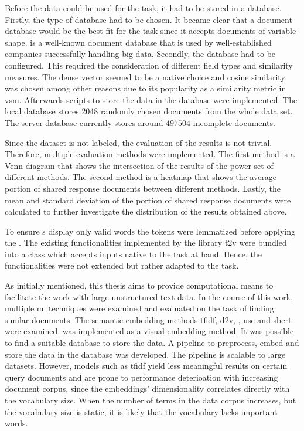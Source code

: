 Before the data could be used for the task, it had to be stored in a database.
Firstly, the type of database had to be chosen.
It became clear that a document database would be the best fit for the task 
since it accepts documents of variable shape.
\databaseName{} is a well-known document database that is used by 
well-established companies successfully handling big data.
Secondly, the database had to be configured.
This required the consideration of different field types and similarity measures.
The dense vector seemed to be a native choice and cosine similarity was chosen 
among other reasons due to its popularity as a similarity metric in \ac{vsm}.
Afterwards scripts to store the data in the database were implemented.
The local database stores 2048 randomly chosen documents from the whole data set.
The server database currently stores around $497504$ incomplete documents.

Since the dataset is not labeled, the evaluation of the results is not trivial.
Therefore, multiple evaluation methods were implemented.
The first method is a Venn diagram that shows the intersection of the results of the power set of different methods.
The second method is a heatmap that shows the average portion of shared response documents between different methods.
Lastly, the mean and standard deviation of the portion of shared response documents were calculated 
to further investigate the distribution of the results obtained above.

To ensure \wordcloud{}s display only valid words the tokens were lemmatized before applying the \wordcloud{}. 
The existing functionalities implemented by the library \ac{t2v} were bundled into a class 
which accepts inputs native to the task at hand.
Hence, the functionalities were not extended but rather adapted to the task.  


As initially mentioned, this thesis aims to provide computational means to facilitate the work with large unstructured text data.
In the course of this work, multiple \ac{ml} techniques were examined and evaluated on the task of finding similar documents.
The semantic embedding methods \ac{tfidf}, \ac{d2v}, \infersent{}, \ac{use} and \ac{sbert} were examined.
\eigendocs{} was implemented as a visual embedding method.
It was possible to find a suitable database to store the data.
A pipeline to preprocess, embed and store the data in the database was developed.
The pipeline is scalable to large datasets.
However, models such as \ac{tfidf} yield less meaningful results on certain query documents and 
are prone to performance deterioation with increasing document corpus, since the embeddings' 
dimensionality correlates directly with the vocabulary size.
When the number of terms in the data corpus increases, but the vocabulary size is static, 
it is likely that the vocabulary lacks important words. 

